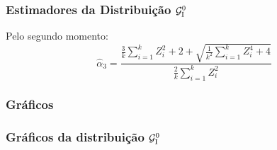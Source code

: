 \begin{frame}
\frametitle{Estimadores da Distribuição $\mathcal{G}_{\rm I}^{0}$}
Pelo segundo momento:
\begin{equation}
\label{eq:Gi0_m_p3}
\hat{\alpha}_3 = \frac{\frac{3}{k}\displaystyle\sum_{i=1}^{k}Z_{i}^{2}+2+\sqrt{\frac{1}{k^{2}}\displaystyle\sum_{i=1}^{k}Z_{i}^{4}+4}}{\frac{2}{k}\displaystyle\sum_{i=1}^{k}Z_{i}^{2}}
\end{equation}

\end{frame}


\subsubsection{Gráficos}
\begin{frame}
\frametitle{Gráficos da distribuição $\mathcal{G}_{\rm I}^{0}$}

\end{frame}



